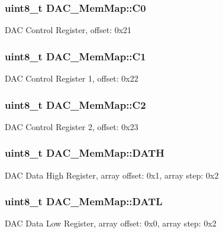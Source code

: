 \subsubsection[{C0}]{\setlength{\rightskip}{0pt plus 5cm}uint8\+\_\+t D\+A\+C\+\_\+\+Mem\+Map\+::\+C0}\label{struct_d_a_c___mem_map_a101597fee641d461b61f0c02c90ef703}
D\+A\+C Control Register, offset\+: 0x21 \hypertarget{struct_d_a_c___mem_map_a29c8fe336000ac0b40c05c444be3bc1b}{}
\subsubsection[{C1}]{\setlength{\rightskip}{0pt plus 5cm}uint8\+\_\+t D\+A\+C\+\_\+\+Mem\+Map\+::\+C1}\label{struct_d_a_c___mem_map_a29c8fe336000ac0b40c05c444be3bc1b}
D\+A\+C Control Register 1, offset\+: 0x22 \hypertarget{struct_d_a_c___mem_map_a8c2e7ea3f41f7b867578fdec48b4dacc}{}
\subsubsection[{C2}]{\setlength{\rightskip}{0pt plus 5cm}uint8\+\_\+t D\+A\+C\+\_\+\+Mem\+Map\+::\+C2}\label{struct_d_a_c___mem_map_a8c2e7ea3f41f7b867578fdec48b4dacc}
D\+A\+C Control Register 2, offset\+: 0x23 \hypertarget{struct_d_a_c___mem_map_ab05302bfcc5f26e258870c56bbdb52b8}{}
\subsubsection[{D\+A\+T\+H}]{\setlength{\rightskip}{0pt plus 5cm}uint8\+\_\+t D\+A\+C\+\_\+\+Mem\+Map\+::\+D\+A\+T\+H}\label{struct_d_a_c___mem_map_ab05302bfcc5f26e258870c56bbdb52b8}
D\+A\+C Data High Register, array offset\+: 0x1, array step\+: 0x2 \hypertarget{struct_d_a_c___mem_map_a5e154a0937bc5d4879efb1fd80f713f0}{}
\subsubsection[{D\+A\+T\+L}]{\setlength{\rightskip}{0pt plus 5cm}uint8\+\_\+t D\+A\+C\+\_\+\+Mem\+Map\+::\+D\+A\+T\+L}\label{struct_d_a_c___mem_map_a5e154a0937bc5d4879efb1fd80f713f0}
D\+A\+C Data Low Register, array offset\+: 0x0, array step\+: 0x2 \hypertarget{struct_d_a_c___mem_map_a146115dd60e5e34ce6f1d8dc2b860877}{}
